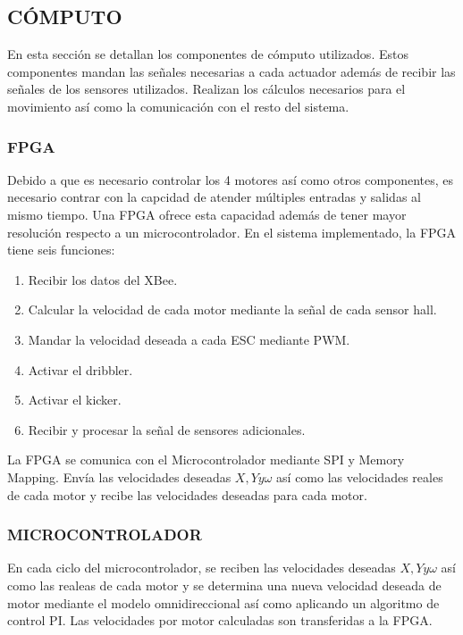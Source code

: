 \documentclass[twocolumn,10pt]{amrob}
\begin{document}
\subsection*{CÓMPUTO}
En esta sección se detallan los componentes de cómputo utilizados. Estos componentes mandan las señales necesarias a cada actuador además de recibir las señales de los sensores utilizados. Realizan los cálculos necesarios para el movimiento así como la comunicación con el resto del sistema.  
\subsubsection*{FPGA}
Debido a que es necesario controlar los 4 motores así como otros componentes, es necesario contrar con la capcidad de atender múltiples entradas y salidas al mismo tiempo. Una FPGA ofrece esta capacidad además de tener mayor resolución respecto a un microcontrolador. En el sistema implementado, la FPGA tiene seis funciones:
\begin{enumerate}
  \item Recibir los datos del XBee.
  \item Calcular la velocidad de cada motor mediante la señal de cada sensor hall.
  \item Mandar la velocidad deseada a cada ESC mediante PWM.
  \item Activar el dribbler.
  \item Activar el kicker.
  \item Recibir y procesar la señal de sensores adicionales.
\end{enumerate}
La FPGA se comunica con el Microcontrolador mediante SPI y Memory Mapping. Envía las velocidades deseadas \(X, Y y \omega\) así como las velocidades reales de cada motor y recibe las velocidades deseadas para cada motor.\par

\subsubsection*{MICROCONTROLADOR}
En cada ciclo del microcontrolador, se reciben las velocidades deseadas \(X, Y y \omega\) así como las realeas de cada motor y se determina una nueva velocidad deseada de motor mediante el modelo omnidireccional así como aplicando un algoritmo de control PI. Las velocidades por motor calculadas son transferidas a la FPGA.
\end{document}
